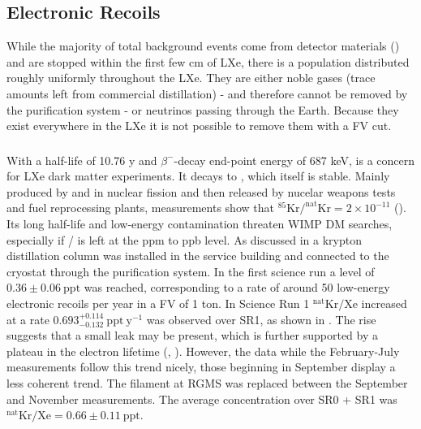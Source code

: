 \subsection{Electronic Recoils}
\label{subsec:backgrounds_electronic}
While the majority of total background events come from detector materials () and are stopped
within the first few cm of LXe, there is a population distributed roughly uniformly throughout the LXe.  They are either noble gases (trace
amounts left from commercial distillation) - and therefore cannot be removed by the purification system - or neutrinos passing through the
Earth.  Because they exist everywhere in the LXe it is not possible to remove them with a FV cut.



\subsubsection{}
\label{subsubsec:backgrounds_electronic_krypton}
With a half-life of 10.76 y and $\beta^-$-decay end-point energy of 687 keV,  is a concern for LXe dark matter
experiments.  It decays to , which itself is stable.  Mainly
produced by  and  in nuclear fission and then released by nucelar weapons tests and fuel reprocessing plants,
measurements show that $\mathrm{^{85}Kr / ^{nat}Kr} = 2 \times 10^{-11}$ ().  Its long half-life and low-energy
contamination threaten WIMP DM searches, especially if / is left at the ppm to ppb level.  As discussed in
 a krypton distillation column was installed in the service building and connected to the cryostat through
the purification system.  In the first science run a level of $0.36 \pm 0.06\ \mathrm{ppt}$ was reached, corresponding to a rate of
around 50 low-energy electronic recoils per year in a FV of 1 ton.  In Science Run 1 $\mathrm{^{nat}Kr / Xe}$ increased at a rate
$0.693_{-0.132}^{+0.114}\ \mathrm{ppt\ y^{-1}}$ was observed over SR1, as shown in
.  The rise suggests that a small leak may be present, which is further supported
by a plateau in the electron lifetime (, ).  However, the data while the February-July
measurements follow this trend nicely, those beginning in September display a less coherent trend.  The filament at RGMS was replaced
between the September and November measurements.  The average concentration over SR0 + SR1 was
$^{\mathrm{nat}}\mathrm{Kr}/\mathrm{Xe} = 0.66 \pm 0.11\ \mathrm{ppt}$.

